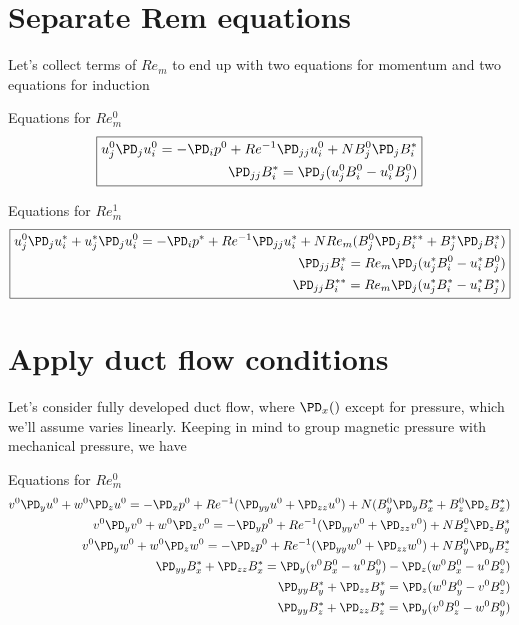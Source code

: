 \documentclass[11pt]{article}
\begin{document}
\section{Separate Rem equations}

Let's collect terms of $Re_m$ to end up with two equations for momentum and two equations for induction

Equations for $Re_m^0$
\begin{equation}\boxed{\begin{aligned}
u_j^0 \PD_j u_i^0 = -\PD_i p^0 + Re^{-1} \PD_{jj} u_i^0 + N B_j^0 \PD_j B_i^* \\
\PD_{jj} B_i^* = \PD_j ( u_j^0 B_i^0 - u_i^0 B_j^0)
\end{aligned}}\end{equation}

Equations for $Re_m^1$
\begin{equation}\boxed{\begin{aligned}
u_j^0 \PD_j u_i^* + u_j^* \PD_j u_i^0 = -\PD_i p^*+ Re^{-1} \PD_{jj} u_i^* + N Re_m ( B_j^0 \PD_j B_i^{**} + B_j^* \PD_j B_i^* ) \\
\PD_{jj} B_i^{*}  = Re_m \PD_j (u_j^* B_i^{0} - u_i^* B_j^{0}) \\
\PD_{jj} B_i^{**} = Re_m \PD_j (u_j^* B_i^{*} - u_i^* B_j^{*}) \\
\end{aligned}}\end{equation}

\section{Apply duct flow conditions}
Let's consider fully developed duct flow, where $\PD_x()$ except for pressure, which we'll assume varies linearly. 
Keeping in mind to group magnetic pressure with mechanical pressure, we have

Equations for $Re_m^0$
\begin{equation}\begin{aligned}
v^0 \PD_y u^0 + w^0 \PD_z u^0 = -\PD_x p^0 + Re^{-1} (\PD_{yy} u^0 + \PD_{zz} u^0 ) + N (B_y^0 \PD_y B_x^* + B_z^0 \PD_z B_x^*) \\
v^0 \PD_y v^0 + w^0 \PD_z v^0 = -\PD_y p^0 + Re^{-1} (\PD_{yy} v^0 + \PD_{zz} v^0 ) + N  B_z^0 \PD_z B_y^* \\
v^0 \PD_y w^0 + w^0 \PD_z w^0 = -\PD_z p^0 + Re^{-1} (\PD_{yy} w^0 + \PD_{zz} w^0 ) + N  B_y^0 \PD_y B_z^* \\
\PD_{yy} B_x^* + \PD_{zz} B_x^* = \PD_y ( v^0 B_x^0 - u^0 B_y^0) - \PD_z ( w^0 B_x^0 - u^0 B_z^0) \\
\PD_{yy} B_y^* + \PD_{zz} B_y^* = \PD_z ( w^0 B_y^0 - v^0 B_z^0) \\
\PD_{yy} B_z^* + \PD_{zz} B_z^* = \PD_y ( v^0 B_z^0 - w^0 B_y^0) \\
\end{aligned}\end{equation}
\end{document}
